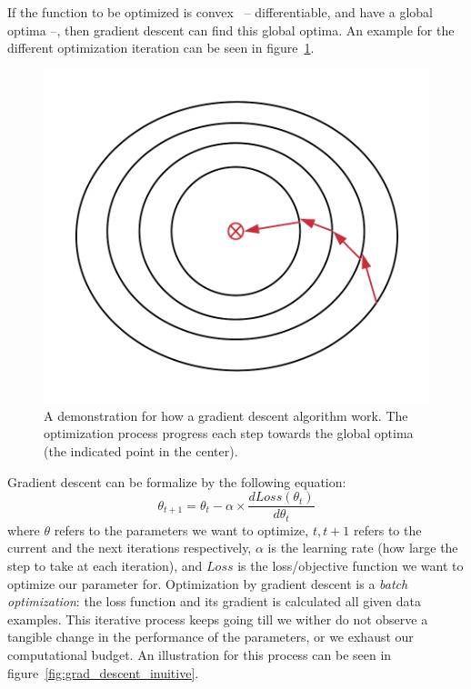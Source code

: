 \par If the function to be optimized is convex~\citep{ben2001lectures} -- differentiable, and have a global optima --, then gradient descent can find this global optima. An example for the different optimization iteration can be seen in figure~\ref{fig:grad_descent}.

\begin{figure}
    \centering
    \includegraphics{images/gbem/grad_descent.png}
    \caption{A demonstration for how a gradient descent algorithm work. The optimization process progress each step towards the global optima (the indicated point in the center).}
    \label{fig:grad_descent}
\end{figure}

\par Gradient descent can be formalize by the following equation:
\begin{equation}
    \theta_{t+1} = \theta_{t} - \alpha \times \frac{d Loss(\theta_t)}{d\theta_t}
    \label{eq:grad_descent}
\end{equation}
where $\theta$ refers to the parameters we want to optimize, $t,t+1$ refers to the current and the next iterations respectively, $\alpha$ is the learning rate (how large the step to take at each iteration), and $Loss$ is the loss/objective function we want to optimize our parameter for. Optimization by gradient descent is a \textit{batch optimization}: the loss function and its gradient is calculated all given data examples. This iterative process keeps going till we wither do not observe a tangible change in the performance of the parameters, or we exhaust our computational budget. An illustration for this process can be seen in figure~\ref{fig:grad_descent_inuitive}.

